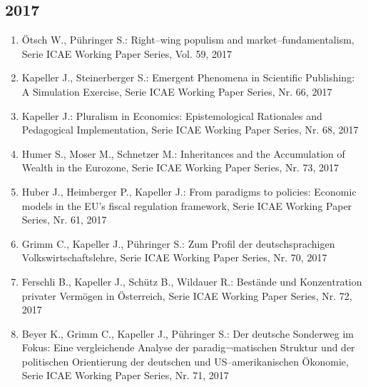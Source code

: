 \subsection*{2017}
\begin{enumerate}
    	 \item Ötsch W., Pühringer S.: Right--wing populism and market--fundamentalism, Serie ICAE Working Paper Series, Vol. 59, 2017
	 \item Kapeller J., Steinerberger S.: Emergent Phenomena in Scientific Publishing: A Simulation Exercise, Serie ICAE Working Paper Series, Nr. 66, 2017
	 \item Kapeller J.: Pluralism in Economics: Epistemological Rationales and Pedagogical Implementation, Serie ICAE Working Paper Series, Nr. 68, 2017
	 \item Humer S., Moser M., Schnetzer M.: Inheritances and the Accumulation of Wealth in the Eurozone, Serie ICAE Working Paper Series, Nr. 73, 2017
	 \item Huber J., Heimberger P., Kapeller J.: From paradigms to policies: Economic models in the EU’s fiscal regulation framework, Serie ICAE Working Paper Series, Nr. 61, 2017
	 \item Grimm C., Kapeller J., Pühringer S.: Zum Profil der deutschsprachigen Volkswirtschaftslehre, Serie ICAE Working Paper Series, Nr. 70, 2017
	 \item Ferschli B., Kapeller J., Schütz B., Wildauer R.: Bestände und Konzentration privater Vermögen in Österreich, Serie ICAE Working Paper Series, Nr. 72, 2017
	 \item Beyer K., Grimm C., Kapeller J., Pühringer S.: Der deutsche Sonderweg im Fokus: Eine vergleichende Analyse der paradig¬matischen Struktur und der politischen Orientierung der deutschen und US--amerikanischen Ökonomie, Serie ICAE Working Paper Series, Nr. 71, 2017
\end{enumerate}
